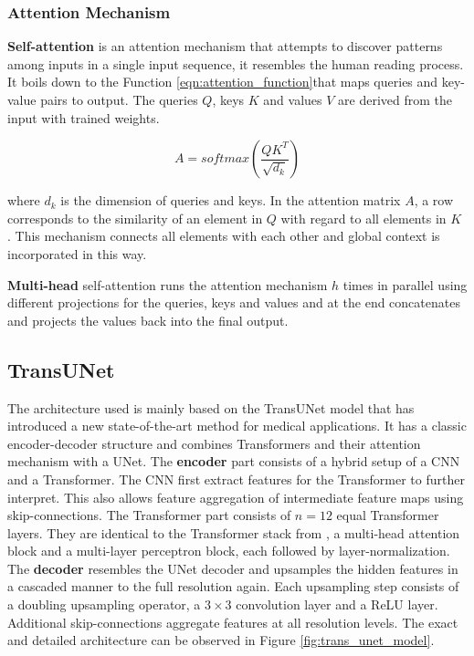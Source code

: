 \documentclass[10pt,conference,compsocconf]{IEEEtran}
\newcommand{\lh}[1] {
  \textcolor{blue}{Lucas: #1}}
\begin{document}

\subsubsection{Attention Mechanism}
\label{sec:attention}

\textbf{Self-attention} is an attention mechanism that attempts to discover patterns among inputs in a single input sequence, it resembles the human reading process. It boils down to the Function \ref{eqn:attention_function}that maps queries and key-value pairs to output. The queries $Q$, keys $K$ and values $V$ are derived from the input with trained weights.

\begin{equation}
    A=softmax(\frac{QK^T}{\sqrt{d_k}})
    \label{eqn:attention_function}
\end{equation}

where $d_k$ is the dimension of queries and keys. In the attention matrix $A$, a row corresponds to the similarity of an element in $Q$ with regard to all elements in $K$ \cite{Vaswani2017}. This mechanism connects all elements with each other and global context is incorporated in this way.

\textbf{Multi-head} self-attention runs the attention mechanism $h$ times in parallel using different projections for the queries, keys and values and at the end concatenates and projects the values back into the final output.

\subsection{TransUNet}
The architecture used is mainly based on the TransUNet \cite{Chen2021} model that has introduced a new state-of-the-art method for medical applications. It has a classic encoder-decoder structure and combines Transformers and their attention mechanism with a UNet. The \textbf{encoder} part consists of a hybrid setup of a CNN and a Transformer. The CNN first extract features for the Transformer to further interpret. This also allows feature aggregation of intermediate feature maps using skip-connections. The Transformer part consists of $n=12$ equal Transformer layers. They are identical to the Transformer stack from \cite{Vaswani2017}, a multi-head attention block and a multi-layer perceptron block, each followed by layer-normalization. The \textbf{decoder} resembles the UNet decoder and upsamples the hidden features in a cascaded manner to the full resolution again. Each upsampling step consists of a doubling upsampling operator, a $3\times 3$ convolution layer and a ReLU layer. Additional skip-connections aggregate features at all resolution levels. The exact and detailed architecture can be observed in Figure \ref{fig:trans_unet_model}.
\end{document}
